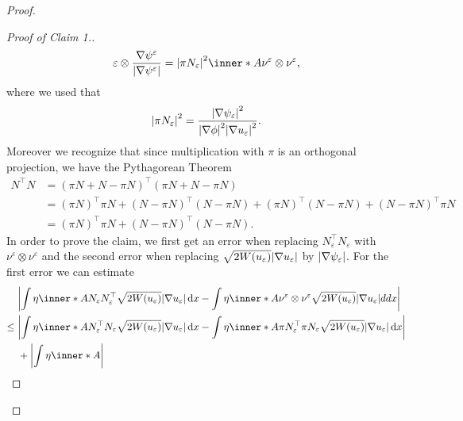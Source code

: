\begin{proof}
\begin{proof}[Proof of Claim 1.]
\begin{align*}
{{{{			\varepsilon } } } \otimes \frac{ \nabla \psi^{ \varepsilon } }{ 
			\abs{ \nabla \psi^{ \varepsilon } } } }
			= 
			\abs{ \pi N_{ \varepsilon } }^{ 2 }
			\inner*{ A }{ \nu^{ \varepsilon } \otimes \nu^{ \varepsilon } },
		\end{align*}
		where we used that 
		\begin{equation*}
			\abs{ \pi N_{ \varepsilon } }^{ 2 }
			=
			\frac{ \abs{ \nabla \psi_{ \varepsilon } }^{ 2 } }{ \abs{ \nabla 
			\phi }^{ 2 } \abs{ \nabla u_{ \varepsilon } }^{ 2 } }.
		\end{equation*}
		Moreover we recognize that since multiplication with $ \pi $ is 
		an orthogonal projection, we have the Pythagorean Theorem
		\begin{align*}
			N^{ \top } N 
			& =
			( \pi N + N - \pi N )^{ \top } ( \pi N + N - \pi N )
			\\
			& =
			( \pi N )^{ \top } \pi N 
			+
			( N - \pi N )^{ \top } ( N - \pi N )
			+
			( \pi N )^{ \top } ( N - \pi N )
			+
			( N - \pi N )^{ \top } \pi N 
			\\
			& =
			( \pi N )^{ \top } \pi N
			+
			( N - \pi N )^{ \top } ( N - \pi N ).
		\end{align*}
		In order to prove the claim, we first get an error when replacing $ N_{ 
		\varepsilon }^{ \top } N_{ \varepsilon } $ with $ \nu^{ \varepsilon } 
		\otimes \nu^{ \varepsilon } $ and the second error when replacing $ 
		\sqrt{ 2 W ( u_{ \varepsilon } ) } \abs{ \nabla u_{ \varepsilon } } $ 
		by $ \abs{ \nabla \psi_{ \varepsilon } } $.
		For the first error we can estimate
		\begin{align*}
			& \abs{ 
				\int
					\eta 
					\inner*{ A }{ N_{ \varepsilon } N_{ \varepsilon }^{ \top } }
					\sqrt{ 2 W ( u_{ \varepsilon } ) } \abs{ \nabla u_{ 
					\varepsilon } }
				\dd{ x }
				-
				\int
					\eta
					\inner*{ A }{ \nu^{ \varepsilon } \otimes \nu^{ \varepsilon 
					} }
					\sqrt{ 2 W ( u_{ \varepsilon } ) } \abs{ \nabla u_{ 
					\varepsilon } }
				dd{ x }
			}
			\\
			\leq{} &
			\abs{ 
				\int
					\eta 
					\inner*{ A }{ N_{ \varepsilon }^{ \top } N_{ \varepsilon } }
					\sqrt{ 2 W ( u_{ \varepsilon } ) } \abs{ \nabla u_{ 
					\varepsilon } } 
				\dd{ x }
				-
				\int 
					\eta
					\inner*{ A }
					{ \pi N_{ \varepsilon }^{ \top } \pi N_{ \varepsilon } }
					\sqrt{ 2 W ( u_{ \varepsilon } ) }
					\abs{ \nabla u_{ \varepsilon } }
				\dd{ x }
			}
			\\
			& + 
			\abs{ 
				\int
					\eta
					\inner*{ A }
}
\end{align*}
\end{proof}
\end{proof}
